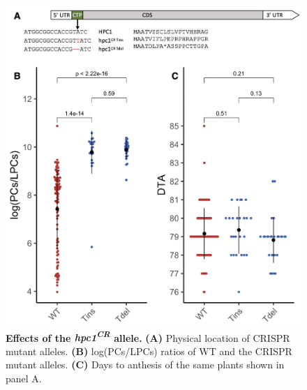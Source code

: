 \begin{subappendices}
\begin{figure}[t]
\begin{center}
\includegraphics[width=0.8\linewidth]{Sup_Figures/Sup_Fig_7.png}
\caption[Effects of the \textit{hpc1\textsuperscript{CR}} allele.]
{\textbf{Effects of the \textit{hpc1\textsuperscript{CR}} allele.}
\textbf{(A)} Physical location of \hpc CRISPR mutant alleles. \textbf{(B)} log(PCs/LPCs) ratios of WT and the \hpc CRISPR mutant alleles. \textbf{(C)} Days to anthesis of the same plants shown in panel A.   
}
\label{figure:Sup:CRISPR_effect}
\end{center}
\end{figure} 
\clearpage




\end{subappendices}
